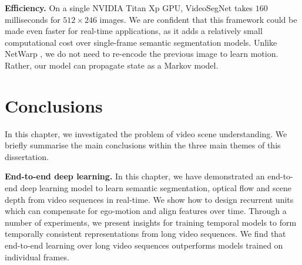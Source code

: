 

\textbf{Efficiency.}
On a single NVIDIA Titan Xp GPU, VideoSegNet takes $160$ milliseconds for $512 \times 246$ images. We are confident that this framework could be made even faster for real-time applications, as it adds a relatively small computational cost over single-frame semantic segmentation models. Unlike NetWarp \citep{gadde2017semantic}, we do not need to re-encode the previous image to learn motion. Rather, our model can propagate state as a Markov model.

\section{Conclusions}

In this chapter, we investigated the problem of video scene understanding. We briefly summarise the main conclusions within the three main themes of this dissertation.

\textbf{End-to-end deep learning.}
In this chapter, we have demonstrated an end-to-end deep learning model to learn semantic segmentation, optical flow and scene depth from video sequences in real-time. We show how to design recurrent units which can compensate for ego-motion and align features over time. Through a number of experiments, we present insights for training temporal models to form temporally consistent representations from long video sequences. We find that end-to-end learning over long video sequences outperforms models trained on individual frames.

